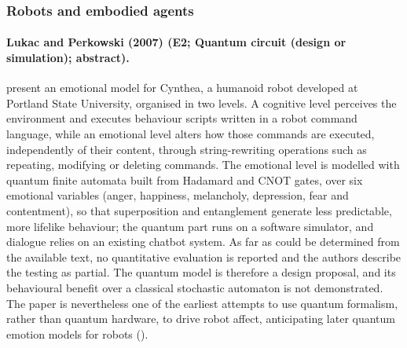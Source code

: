 \documentclass[10pt,a4paper]{article}
\begin{document}
\subsubsection*{Robots and embodied agents}
\paragraph{Lukac and Perkowski (2007) (E2; Quantum circuit (design or simulation); abstract).} \citet{Lukac2007} present an emotional model for Cynthea, a humanoid robot developed at Portland State University, organised in two levels. A cognitive level perceives the environment and executes behaviour scripts written in a robot command language, while an emotional level alters how those commands are executed, independently of their content, through string-rewriting operations such as repeating, modifying or deleting commands. The emotional level is modelled with quantum finite automata built from Hadamard and CNOT gates, over six emotional variables (anger, happiness, melancholy, depression, fear and contentment), so that superposition and entanglement generate less predictable, more lifelike behaviour; the quantum part runs on a software simulator, and dialogue relies on an existing chatbot system. As far as could be determined from the available text, no quantitative evaluation is reported and the authors describe the testing as partial. The quantum model is therefore a design proposal, and its behavioural benefit over a classical stochastic automaton is not demonstrated. The paper is nevertheless one of the earliest attempts to use quantum formalism, rather than quantum hardware, to drive robot affect, anticipating later quantum emotion models for robots (\citep{Yan2019}).
\end{document}
